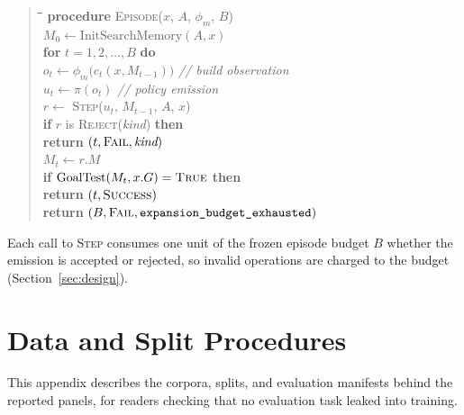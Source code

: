 \begin{quote}
\small
\begin{tabbing}
\hspace{1.5em}\=\hspace{1.5em}\=\hspace{1.5em}\=\kill
\textbf{procedure} \textsc{Episode}($x$, $A$, $\phi_m$, $B$) \\
\> $M_0 \leftarrow \mathrm{InitSearchMemory}(A, x)$ \\
\> \textbf{for} $t = 1, 2, \ldots, B$ \textbf{do} \\
\>\> $o_t \leftarrow \phi_m\bigl(c_t(x, M_{t-1})\bigr)$ \hspace{2em} \textit{// build observation} \\
\>\> $u_t \leftarrow \pi(o_t)$ \hspace{6.4em} \textit{// policy emission} \\
\>\> $r \leftarrow$ \textsc{Step}($u_t$, $M_{t-1}$, $A$, $x$) \\
\>\> \textbf{if} $r$ is \textsc{Reject}(\textit{kind}) \textbf{then} \\
\>\>\> \textbf{return} $(t, \textsc{Fail}, \textit{kind})$ \\
\>\> $M_t \leftarrow r.M$ \\
\>\> \textbf{if} $\mathrm{GoalTest}(M_t, x.G) = \textsc{True}$ \textbf{then} \\
\>\>\> \textbf{return} $(t, \textsc{Success})$ \\
\> \textbf{return} $(B, \textsc{Fail}, \texttt{expansion\_budget\_exhausted})$
\end{tabbing}
\end{quote}

Each call to \textsc{Step} consumes one unit of the frozen episode budget $B$ whether the emission is accepted or rejected, so invalid operations are charged to the budget (Section~\ref{sec:design}).


\section{Data and Split Procedures}
\label{app:data-splits}

This appendix describes the corpora, splits, and evaluation manifests behind the reported panels, for readers checking that no evaluation task leaked into training.

